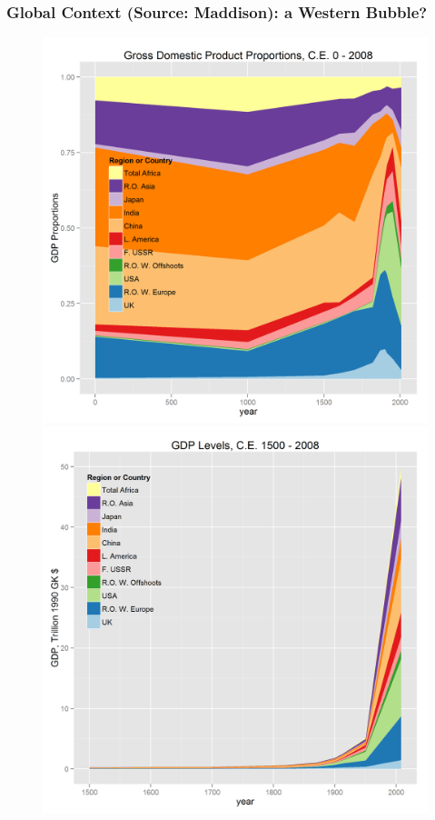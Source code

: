 \documentclass[final]{beamer}
\begin{document}
\begin{frame}
\frametitle{Global Context (Source: Maddison): a Western Bubble?}
\begin{figure}[p!]
\label{fig:worldContext}
		\mbox{\includegraphics[height=0.43\textheight]{maddisonreggdppct}}
		\mbox{\includegraphics[height=0.43\textheight]{maddisonreggdplevels}}\\

\end{figure}
\end{frame}
\end{document}
